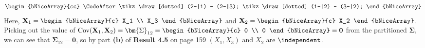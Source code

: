 \begin{enumerate}[label= (\alph*)]
\[\begin{bNiceArray}{cc}
            \CodeAfter \tikz \draw[dotted] (2-|1) -- (2-|3);
            \tikz \draw[dotted] (1-|2) -- (3-|2);
        \end{bNiceArray}
    \]
    Here, $\textbf{X}_1 = \begin{bNiceArray}{c} X_1 \\ X_3 \end{bNiceArray}$ and $\textbf{X}_2 = \begin{bNiceArray}{c} X_2 \end{bNiceArray}$. Picking out the value of $\text{Cov}(\textbf{X}_1, \textbf{X}_2) = \bm{\Sigma}_{12} = \begin{bNiceArray}{c} 0 \\ 0 \end{bNiceArray} = \textbf{0}$ from the partitioned $\bm{\Sigma}$, we can see that $\bm{\Sigma}_{12} = \textbf{0}$, so by part \textbf{(b)} of \textbf{Result 4.5} on page 159 $(X_1, X_3)$ and $X_2$ are $\independent$.


\end{enumerate}
